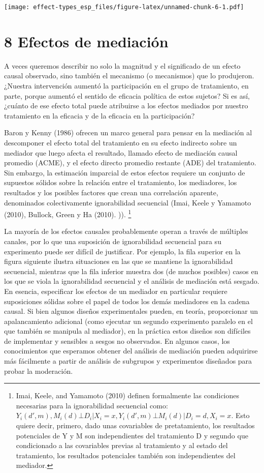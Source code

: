 \documentclass[
]{article}
\begin{document}
\texttt{[image: effect-types\_esp\_files/figure-latex/unnamed-chunk-6-1.pdf]}

\hypertarget{efectos-de-mediaciuxf3n}{%
\section{8 Efectos de mediación}\label{efectos-de-mediaciuxf3n}}

A veces queremos describir no solo la magnitud y el significado de un
efecto causal observado, sino también el mecanismo (o mecanismos) que lo
produjeron. ¿Nuestra intervención aumentó la participación en el grupo
de tratamiento, en parte, porque aumentó el sentido de eficacia política
de estos sujetos? Si es así, ¿cuánto de ese efecto total puede
atribuirse a los efectos mediados por nuestro tratamiento en la eficacia
y de la eficacia en la participación?

Baron y Kenny (1986) ofrecen un marco general para pensar en la
mediación al descomponer el efecto total del tratamiento en su efecto
indirecto sobre un mediador que luego afecta el resultado, llamado
efecto de mediación causal promedio (ACME), y el efecto directo promedio
restante (ADE) del tratamiento. Sin embargo, la estimación imparcial de
estos efectos requiere un conjunto de supuestos sólidos sobre la
relación entre el tratamiento, los mediadores, los resultados y los
posibles factores que crean una correlación aparente, denominados
colectivamente ignorabilidad secuencial (Imai, Keele y Yamamoto (2010),
Bullock, Green y Ha (2010). )). \footnote{Imai, Keele, and Yamamoto
  (2010) definen formalmente las condiciones necesarias para la
  ignorabilidad secuencial como:
  \({Y_i(d',m),M_i(d)}⊥D_i|X_i=x, Y_i(d',m)⊥M_i(d)|D_i=d,X_i=x\). Esto
  quiere decir, primero, dado unas covariables de pretatamiento, los
  resultados potenciales de Y y M son independientes del tratamiento D y
  segundo que condicionado a las covariables previas al tratamiento y al
  estado del tratamiento, los resultados potenciales también son
  independientes del mediador.}

La mayoría de los efectos causales probablemente operan a través de
múltiples canales, por lo que una suposición de ignorabilidad secuencial
para su experimento puede ser difícil de justificar. Por ejemplo, la
fila superior en la figura siguiente ilustra situaciones en las que se
mantiene la ignorabilidad secuencial, mientras que la fila inferior
muestra dos (de muchos posibles) casos en los que se viola la
ignorabilidad secuencial y el análisis de mediación está sesgado. En
esencia, especificar los efectos de un mediador en particular requiere
suposiciones sólidas sobre el papel de todos los demás mediadores en la
cadena causal. Si bien algunos diseños experimentales pueden, en teoría,
proporcionar un apalancamiento adicional (como ejecutar un segundo
experimento paralelo en el que también se manipula al mediador), en la
práctica estos diseños son difíciles de implementar y sensibles a sesgos
no observados. En algunos casos, los conocimientos que esperamos obtener
del análisis de mediación pueden adquirirse más fácilmente a partir de
análisis de subgrupos y experimentos diseñados para probar la
moderación.
\end{document}
